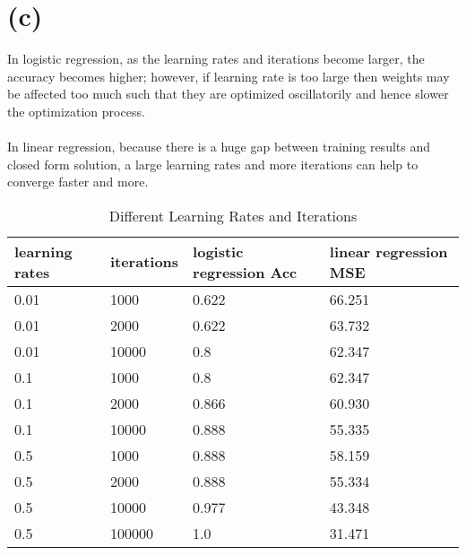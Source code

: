 \documentclass[12pt,a4paper]{article}
\begin{document}
\section*{(c)}
In logistic regression, as the learning rates and iterations become larger, the accuracy becomes higher; however, if 
learning rate is too large then weights may be affected too much such that they are optimized oscillatorily and hence slower the optimization process.\\
\\
In linear regression, because there is a huge gap between training results and closed form solution, a large learning rates and more iterations can help to converge faster and more.

\begin{table}[htbp]
    \centering
    \caption{Different Learning Rates and Iterations}
    \label{label3}
    \begin{tabular}[t]{llll}
    \hline
    learning rates & iterations &logistic regression Acc & linear regression MSE\\
    \hline
    0.01 & 1000 & 0.622 & 66.251 \\
    0.01 & 2000 & 0.622 & 63.732 \\
    0.01 & 10000 & 0.8 & 62.347 \\
    0.1 & 1000 & 0.8 & 62.347 \\
    0.1 & 2000 & 0.866 & 60.930 \\
    0.1 & 10000 & 0.888 & 55.335 \\
    0.5 & 1000 & 0.888 & 58.159 \\
    0.5 & 2000 & 0.888 & 55.334 \\
    0.5 & 10000 & 0.977 & 43.348 \\
    0.5 & 100000 & 1.0 & 31.471 \\
    \hline
    \end{tabular}
\end{table}
\newpage
\end{document}

